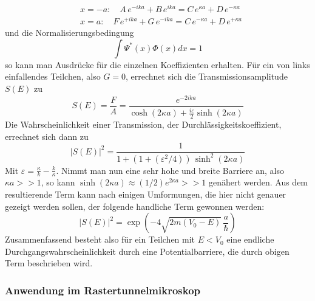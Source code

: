 \begin{align*}
    &x=-a: \quad A \, e^{-ika} + B \, e^{ika} = C \, e^{\kappa a} 
        + D \, e^{-\kappa a}\\
    &x=a: \quad F \, e^{+ika} + G \, e^{-ika} = C \, e^{-\kappa a} 
        + D \, e^{+\kappa a}
\end{align*}
und die Normalisierungsbedingung
\[
    \int \Psi^* (x) \Phi (x) dx = 1
\]
so kann man Ausdrücke für die einzelnen Koeffizienten erhalten. Für ein von links 
einfallendes Teilchen, also $G=0$, errechnet sich die Transmissionsamplitude 
$S(E)$ zu
\[
    S(E) = \frac{F}{A} = \frac{e^{-2ika}}{\cosh(2\kappa a) + \frac{i \varepsilon}{2}
                               \sinh(2\kappa a)}
\]
Die Wahrscheinlichkeit einer Transmission, der Durchlässigkeitskoeffizient, 
errechnet sich dann zu
\[
    | S(E) |^2 = \frac{1}{1+(1+(\varepsilon^2/4)) \, \sinh^2(2\kappa a)}
\]
Mit $\varepsilon = \frac{\kappa}{k}-\frac{k}{\kappa}$.
Nimmt man nun eine sehr hohe und breite Barriere an, also $\kappa a >> 1$, so
kann $\sinh (2 \kappa a) \approx (1/2) e^{2\kappa a} >> 1$ genähert werden.
Aus dem resultierende Term kann nach einigen Umformungen, die hier nicht genauer
gezeigt werden sollen, der folgende handliche Term gewonnen werden:
\[
    | S(E) |^2 = \exp\left(-4 \sqrt{2m(V_0-E)} \, \frac{a}{\hbar}\right)
\]
Zusammenfassend besteht also für ein Teilchen mit $E<V_0$ eine endliche 
Durchgangswahrscheinlichkeit durch eine Potentialbarriere, die durch 
obigen Term beschrieben wird. \cite{schwabl}

        \subsubsection{Anwendung im Rastertunnelmikroskop}

